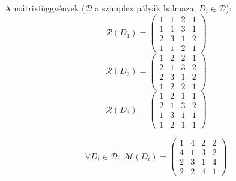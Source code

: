 \begin{frame}
  A mátrixfüggvények ($\mathcal{D}$ a szimplex pályák halmaza,
  $D_i\in\mathcal{D}$):
  \begin{equation*}
    \mathcal{R}(D_1)=
    \left(
    \begin{array}{cccc}
      1 & 1 & 2 & 1\\
      1 & 1 & 3 & 1\\
      2 & 3 & 1 & 2\\
      1 & 1 & 2 & 1
    \end{array}
    \right)
  \end{equation*}
  \begin{equation*}
    \mathcal{R}(D_2)=
    \left(
    \begin{array}{cccc}
      1 & 2 & 2 & 1\\
      2 & 1 & 3 & 2\\
      2 & 3 & 1 & 2\\
      1 & 2 & 2 & 1
    \end{array}
    \right)
  \end{equation*}
  \begin{equation*}
    \mathcal{R}(D_3)=
    \left(
    \begin{array}{cccc}
      1 & 2 & 1 & 1\\
      2 & 1 & 3 & 2\\
      1 & 3 & 1 & 1\\
      1 & 2 & 1 & 1
    \end{array}
    \right)
  \end{equation*}

  \begin{equation*}
    \forall D_i\in\mathcal{D}:\;
    \mathcal{M}(D_i)=
    \left(
    \begin{array}{cccc}
      1 & 4 & 2 & 2\\
      4 & 1 & 3 & 2\\
      2 & 3 & 1 & 4\\
      2 & 2 & 4 & 1
    \end{array}
    \right)
  \end{equation*}
\end{frame}


